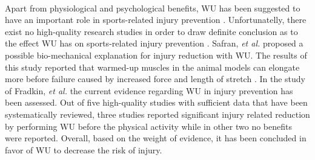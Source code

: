 \\Apart from physiological and psychological benefits, WU has been suggested to have an important role in sports-related injury prevention \cite{shellock1985warming}. Unfortunatelly, there exist no high-quality research studies in order to draw definite conclusion as to the effect WU has on sports-related injury prevention \cite{fields2007should}. Safran, \textit{et al.} proposed a possible bio-mechanical explanation for injury reduction with WU. The results of this study reported that warmed-up muscles in the animal models can elongate more before failure caused by increased force and length of stretch \cite{safran1989warm}. In the study of Fradkin, \textit{et al.} the current evidence regarding WU in injury prevention has been assessed. Out of five high-quality studies with sufficient data that have been systematically reviewed, three studies reported significant injury related reduction by performing WU before the physical activity while in other two no benefits were reported. Overall, based on the weight of evidence, it has been concluded in favor of WU to decrease the risk of injury.\\
